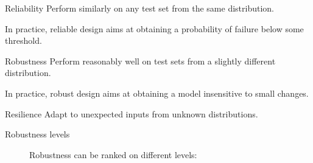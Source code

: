 \begin{remark} \phantom{}
    \begin{descriptionlist}
        \item[Reliability] 
            Perform similarly on any test set from the same distribution.

            In practice, reliable design aims at obtaining a probability of failure below some threshold.

        \item[Robustness] 
            Perform reasonably well on test sets from a slightly different distribution.

            In practice, robust design aims at obtaining a model insensitive to small changes.

        \item[Resilience]
            Adapt to unexpected inputs from unknown distributions.
    \end{descriptionlist}
\end{remark}


\begin{description}
    \item[Robustness levels] 
        Robustness can be ranked on different levels:
\end{description}


